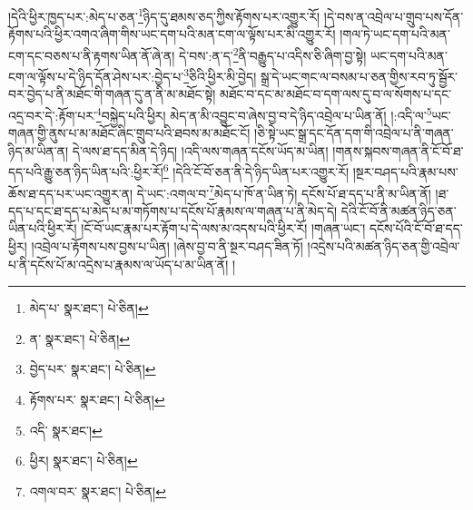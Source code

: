 །དེའི་ཕྱིར་ཁྱད་པར་:མེད་པ་ཅན་\footnote{མེད་པ་  སྣར་ཐང་།  པེ་ཅིན། }ཉིད་དུ་ཐམས་ཅད་ཀྱིས་རྟོགས་པར་འགྱུར་རོ། །དེ་བས་ན་འབྲེལ་པ་གྲུབ་པས་དོན་རྟོགས་པའི་ཕྱིར་འགའ་ཞིག་གིས་ཡང་དག་པའི་མན་ངག་ལ་ལྟོས་པར་མི་འགྱུར་རོ། །གལ་ཏེ་ཡང་དག་པའི་མན་ངག་དང་བཅས་པ་ནི་རྟགས་ཡིན་ནོ་ཞེ་ན། དེ་བས་:ན་ད་\footnote{ན་  སྣར་ཐང་།  པེ་ཅིན། }ནི་བརྒྱུད་པ་འདིས་ཅི་ཞིག་བྱ་སྟེ། ཡང་དག་པའི་མན་ངག་ལ་ལྟོས་པ་དེ་ཉིད་དོན་ཤེས་པར་:བྱེད་པ་\footnote{བྱེད་པར་  སྣར་ཐང་།  པེ་ཅིན། }ཅིའི་ཕྱིར་མི་བྱེད། སྒྲ་དེ་ཡང་གང་ལ་བསམ་པ་ཅན་གྱིས་རབ་ཏུ་སྦྱོར་བར་བྱེད་པ་ནི་མཐོང་གི་གཞན་དུ་ན་ནི་མ་མཐོང་སྟེ། མཐོང་བ་དང་མ་མཐོང་བ་དག་ལས་དུ་བ་ལ་སོགས་པ་དང་འདྲ་བར་དེ་:རྟོག་པར་\footnote{རྟོགས་པར་  སྣར་ཐང་།  པེ་ཅིན། }བསྐྱེད་པའི་ཕྱིར། མེད་ན་མི་འབྱུང་བ་ཞེས་བྱ་བ་དེ་ཉིད་འབྲེལ་པ་ཡིན་ནོ། །:འདི་ལ་\footnote{འདི་  སྣར་ཐང་། }ཡང་གཞན་གྱི་ནུས་པ་མ་མཐོང་ཞིང་གྲུབ་པའི་ཐབས་མ་མཐོང་ངོ། །ཅི་སྟེ་ཡང་སྒྲ་དང་དོན་དག་གི་འབྲེལ་པ་ནི་གཞན་ཉིད་མ་ཡིན་ན། དེ་ལས་ཐ་དད་མིན་དེ་ཉིད། །འདི་ལས་གཞན་དངོས་ཡོད་མ་ཡིན། །གནས་སྐབས་གཞན་ནི་ངོ་བོ་ཐ་དད་པའི་རྒྱུ་ཅན་ཉིད་ཡིན་པའི་:ཕྱིར་རོ།\footnote{ཕྱིར།  སྣར་ཐང་།  པེ་ཅིན། } །དེའི་ངོ་བོ་ཅན་ནི་དེ་ཉིད་ཡིན་པར་འགྱུར་རོ། །སྔར་བཤད་པའི་རྣམ་པས་ཆོས་ཐ་དད་པར་ཡང་འགྱུར་ན། དེ་ཡང་:འགལ་བ་\footnote{འགལ་བར་  སྣར་ཐང་།  པེ་ཅིན། }མེད་པ་ཁོ་ན་ཡིན་ཏེ། དངོས་པོ་ཐ་དད་པ་ནི་མ་ཡིན་ནོ། །ཐ་དད་པ་དང་ཐ་དད་པ་མེད་པ་མ་གཏོགས་པ་དངོས་པོ་རྣམས་ལ་གཞན་པ་ནི་མེད་དེ། དེའི་ངོ་བོ་ནི་མཚན་ཉིད་ཅན་ཡིན་པའི་ཕྱིར་རོ། །ངོ་བོ་ཡང་རྣམ་པར་རྟོག་པ་དེ་ལས་མ་འདས་པའི་ཕྱིར་རོ། །གཞན་ཡང་། དངོས་པོའི་ངོ་བོ་ཐ་དད་ཕྱིར། །འབྲེལ་པ་རྟོགས་པས་བྱས་པ་ཡིན། །ཞེས་བྱ་བ་ནི་སྔར་བཤད་ཟིན་ཏོ། །འདྲེས་པའི་མཚན་ཉིད་ཅན་གྱི་འབྲེལ་པ་ནི་དངོས་པོ་མ་འདྲེས་པ་རྣམས་ལ་ཡོད་པ་མ་ཡིན་ནོ། །
